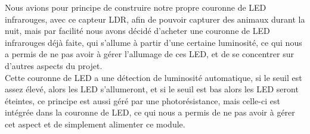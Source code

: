 \begin{table}[H]
    \centering
    \footnotesize
    \setlength{\tabcolsep}{3pt}
    \renewcommand{\arraystretch}{1.15}
    \caption{Comparaison des mesures de luminosite : theorie, calcul numerique et mesures pratiques}
    \label{tab:ldr_comparaison}
\end{table}

Nous avions pour principe de construire notre propre couronne de LED infrarouges, avec ce capteur LDR, afin de pouvoir capturer des
animaux durant la nuit, mais par facilité nous avons décidé d'acheter une couronne de LED infrarouges déjà faite, 
qui s'allume à partir d'une certaine luminosité, ce qui nous a permis de ne pas avoir à gérer l'allumage de ces LED, et de se 
concentrer sur d'autres aspects du projet.
\\

Cette couronne de LED a une détection de luminosité automatique, si le seuil est assez élevé, alors les LED s'allumeront, 
et si le seuil est bas alors les LED seront éteintes, ce principe est aussi géré par une photorésistance, 
mais celle-ci est intégrée dans la couronne de LED, ce qui nous a permis de ne pas avoir à gérer cet aspect et de simplement alimenter ce module.
\\

